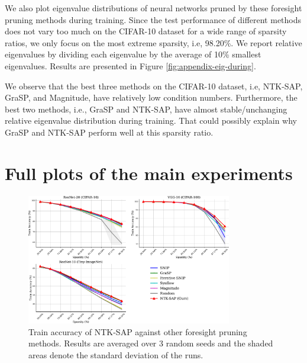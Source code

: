 \documentclass{article} %
\begin{document}
We also plot eigenvalue distributions of neural networks pruned by these foresight pruning methods during training. Since the test performance of different methods does not vary too much on the CIFAR-10 dataset for a wide range of sparsity ratios, we only focus on the most extreme sparsity, i.e, 98.20\%. We report relative eigenvalues by dividing each eigenvalue by the average of 10\% smallest eigenvalues. Results are presented in Figure \ref{fig:appendix-eig-during}.

We observe that the best three methods on the CIFAR-10 dataset, i.e, NTK-SAP, GraSP, and Magnitude, have relatively low condition numbers. Furthermore, the best two methods, i.e., GraSP and NTK-SAP, have almost stable/unchanging relative eigenvalue distribution during training. That could possibly explain why GraSP and NTK-SAP perform well at this sparsity ratio.
\section{Full plots of the main experiments} \label{sect:full-plots}

\begin{figure}
  \centering
    \includegraphics[width=0.8\textwidth]{plots/appendix-train-full.pdf}
   \caption{Train accuracy of NTK-SAP against other foresight pruning methods. Results are averaged over 3 random seeds and the shaded areas denote the standard deviation of the runs.}
   \label{fig:appendix-train-full}
\end{figure}
\end{document}
